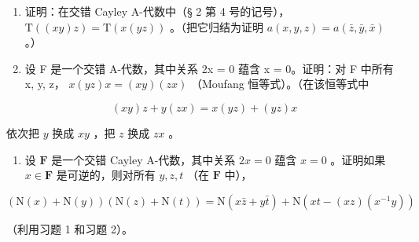 \BourbakiAppendixExercises

\begin{enumerate}
\def\labelenumi{\arabic{enumi}.}
\item
  证明：在交错 Cayley A-代数中（§ 2 第 4 号的记号）， \(\mathrm{T}((xy)z) = \mathrm{T}(x(yz))\) 。（把它归结为证明 \(a(x,y,z) = a(\bar{z},\bar{y},\bar{x})\) 。）
\item
  设 F 是一个交错 A-代数，其中关系 2x = 0 蕴含 x = 0。证明：对 F 中所有 x, y, z， \(x(yz)x = (xy)(zx)\) （Moufang 恒等式）。（在该恒等式中
\end{enumerate}

\[
(x y) z + y (z x) = x (y z) + (y z) x
\]

依次把 \(y\) 换成 \(xy\) ，把 \(z\) 换成 \(zx\) 。

\begin{enumerate}
\def\labelenumi{\arabic{enumi}.}
\setcounter{enumi}{2}
\tightlist
\item
  设 \(\mathbf{F}\) 是一个交错 Cayley A-代数，其中关系 \(2x = 0\) 蕴含 \(x = 0\) 。证明如果 \(x \in \mathbf{F}\) 是可逆的，则对所有 \(y, z, t\) （在 \(\mathbf{F}\) 中），
\end{enumerate}

\[
(\mathrm{N} (x) + \mathrm{N} (y)) (\mathrm{N} (z) + \mathrm{N} (t)) = \mathrm{N} (x \bar {z} + y \bar {t}) + \mathrm{N} (x t - (x z) (x ^ {- 1} y))
\]

（利用习题 1 和习题 2）。
\relax{}
\backmatter
